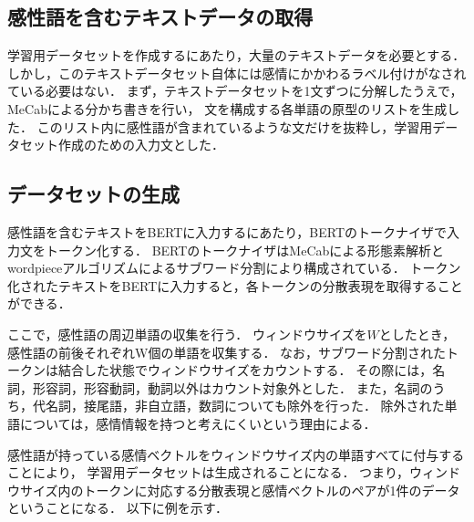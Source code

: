 		\subsection{感性語を含むテキストデータの取得}
			学習用データセットを作成するにあたり，大量のテキストデータを必要とする．
			しかし，このテキストデータセット自体には感情にかかわるラベル付けがなされている必要はない．
			まず，テキストデータセットを1文ずつに分解したうえで，MeCabによる分かち書きを行い，
			文を構成する各単語の原型のリストを生成した．
			このリスト内に感性語が含まれているような文だけを抜粋し，学習用データセット作成のための入力文とした．

		\subsection{データセットの生成}
			感性語を含むテキストをBERTに入力するにあたり，BERTのトークナイザで入力文をトークン化する．
			BERTのトークナイザはMeCabによる形態素解析とwordpieceアルゴリズムによるサブワード分割により構成されている．
			トークン化されたテキストをBERTに入力すると，各トークンの分散表現を取得することができる．

			ここで，感性語の周辺単語の収集を行う．
			ウィンドウサイズを$W$としたとき，感性語の前後それぞれW個の単語を収集する．
			なお，サブワード分割されたトークンは結合した状態でウィンドウサイズをカウントする．
			その際には，名詞，形容詞，形容動詞，動詞以外はカウント対象外とした．
			また，名詞のうち，代名詞，接尾語，非自立語，数詞についても除外を行った．
			除外された単語については，感情情報を持つと考えにくいという理由による．

			感性語が持っている感情ベクトルをウィンドウサイズ内の単語すべてに付与することにより，
			学習用データセットは生成されることになる．
			つまり，ウィンドウサイズ内のトークンに対応する分散表現と感情ベクトルのペアが1件のデータ
			ということになる．
			以下に例を示す．

